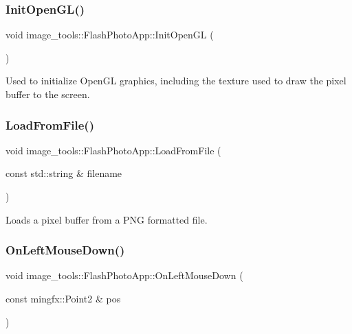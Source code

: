 \subsubsection{\texorpdfstring{Init\+Open\+G\+L()}{InitOpenGL()}}
{\footnotesize\ttfamily void image\+\_\+tools\+::\+Flash\+Photo\+App\+::\+Init\+Open\+GL (\begin{DoxyParamCaption}{ }\end{DoxyParamCaption})\hspace{0.3cm}{\ttfamily [override]}}

Used to initialize Open\+GL graphics, including the texture used to draw the pixel buffer to the screen. \mbox{\label{classimage__tools_1_1FlashPhotoApp_aee942a00db0ff47ed36f4a78bf308482}} 
\subsubsection{\texorpdfstring{Load\+From\+File()}{LoadFromFile()}}
{\footnotesize\ttfamily void image\+\_\+tools\+::\+Flash\+Photo\+App\+::\+Load\+From\+File (\begin{DoxyParamCaption}\item[{const std\+::string \&}]{filename }\end{DoxyParamCaption})}

Loads a pixel buffer from a P\+NG formatted file. \mbox{\label{classimage__tools_1_1FlashPhotoApp_af26aeb5420b9f123fba9330abc3ff907}} 
\subsubsection{\texorpdfstring{On\+Left\+Mouse\+Down()}{OnLeftMouseDown()}}
{\footnotesize\ttfamily void image\+\_\+tools\+::\+Flash\+Photo\+App\+::\+On\+Left\+Mouse\+Down (\begin{DoxyParamCaption}\item[{const mingfx\+::\+Point2 \&}]{pos }\end{DoxyParamCaption})\hspace{0.3cm}{\ttfamily [override]}}

